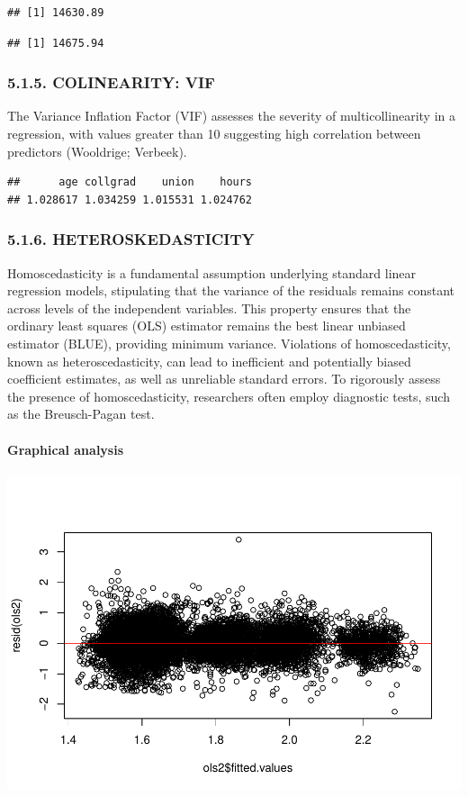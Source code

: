 \documentclass[
]{article}
\begin{document}
\begin{verbatim}
## [1] 14630.89
\end{verbatim}

\begin{verbatim}
## [1] 14675.94
\end{verbatim}

\hypertarget{colinearity-vif}{%
\subsubsection{5.1.5. COLINEARITY: VIF}\label{colinearity-vif}}

The Variance Inflation Factor (VIF) assesses the severity of
multicollinearity in a regression, with values greater than 10
suggesting high correlation between predictors (Wooldrige; Verbeek).

\begin{verbatim}
##      age collgrad    union    hours 
## 1.028617 1.034259 1.015531 1.024762
\end{verbatim}

\hypertarget{heteroskedasticity}{%
\subsubsection{5.1.6. HETEROSKEDASTICITY}\label{heteroskedasticity}}

Homoscedasticity is a fundamental assumption underlying standard linear
regression models, stipulating that the variance of the residuals
remains constant across levels of the independent variables. This
property ensures that the ordinary least squares (OLS) estimator remains
the best linear unbiased estimator (BLUE), providing minimum variance.
Violations of homoscedasticity, known as heteroscedasticity, can lead to
inefficient and potentially biased coefficient estimates, as well as
unreliable standard errors. To rigorously assess the presence of
homoscedasticity, researchers often employ diagnostic tests, such as the
Breusch-Pagan test.

\hypertarget{graphical-analysis}{%
\paragraph{Graphical analysis}\label{graphical-analysis}}

\includegraphics{Rintro2_files/figure-latex/unnamed-chunk-11-1.pdf}
\end{document}
